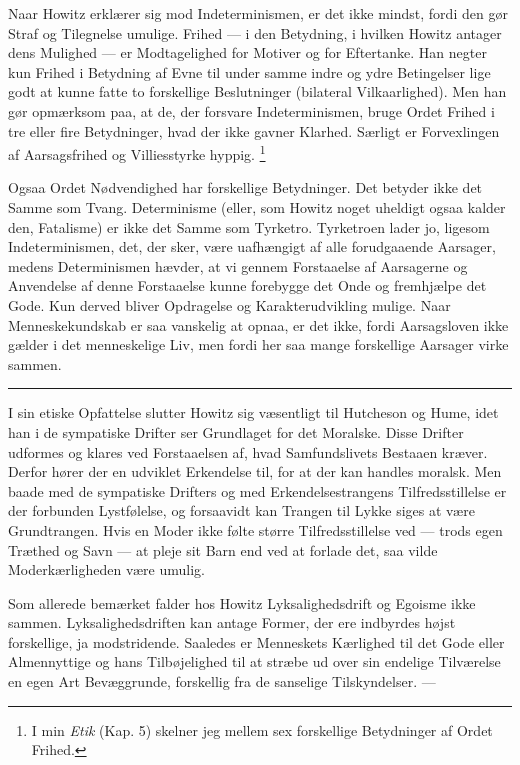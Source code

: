 \documentclass[12pt,a4paper,openany]{book}
\newcommand{\opage}[1]{\marginnote{\footnotesize\textit{[#1]}}}
\begin{document}
Naar Howitz erklærer sig mod Indeterminismen, er det ikke mindst, fordi den gør
Straf og Tilegnelse umulige. Frihed --- i den Betydning, i hvilken Howitz
antager dens Mulighed --- er Modtagelighed for Motiver og for Eftertanke. Han
negter kun Frihed i Betydning af Evne til under samme indre og ydre Betingelser
lige godt at kunne fatte to forskellige Beslutninger (bilateral Vilkaarlighed).
Men han gør opmærksom paa, at de, der forsvare Indeterminismen, bruge Ordet
Frihed i tre eller fire Betydninger, hvad der ikke gavner Klarhed. Særligt er
Forvexlingen af Aarsagsfrihed og Villiesstyrke hyppig.%
\footnote[1]{I min \textit{Etik} (Kap. 5) skelner jeg mellem sex forskellige
Betydninger af Ordet Frihed.}

Ogsaa Ordet Nødvendighed har forskellige Betydninger. Det betyder ikke det
Samme som Tvang. Determinisme (eller, som Howitz noget uheldigt ogsaa kalder
den, Fatalisme) er ikke det Samme som Tyrketro. Tyrketroen lader jo, ligesom
Indeterminismen, det, der sker, være uafhængigt af alle forudgaaende Aarsager,
medens Determinismen hævder, at vi gennem Forstaaelse af Aarsagerne og
Anvendelse af denne Forstaaelse kunne forebygge det Onde og fremhjælpe det
Gode. Kun derved bliver Opdragelse og Karakterudvikling mulige. Naar
Menneskekundskab er saa vanskelig at opnaa, er det ikke, fordi Aarsagsloven
ikke gælder i det menneskelige Liv, men fordi her saa mange forskellige
Aarsager virke sammen.

\begin{center}\rule{2cm}{0.4pt}\end{center}

I sin etiske Opfattelse slutter Howitz sig væsentligt til Hutcheson og Hume,
idet han i de sympatiske Drifter ser Grundlaget for det Moralske. Disse Drifter
udformes og klares ved Forstaaelsen af, hvad Samfundslivets Bestaaen kræver.
Derfor hører der en udviklet Erkendelse til, for at der kan handles moralsk.
Men baade med de sympatiske
\setcounter{footnote}{0}%
\opage{88}Drifters og med Erkendelsestrangens Tilfredsstillelse er der
forbunden Lystfølelse, og forsaavidt kan Trangen til Lykke siges at være
Grundtrangen. Hvis en Moder ikke følte større Tilfredsstillelse ved --- trods
egen Træthed og Savn --- at pleje sit Barn end ved at forlade det, saa vilde
Moderkærligheden være umulig.

Som allerede bemærket falder hos Howitz Lyksalighedsdrift og Egoisme ikke
sammen. Lyksalighedsdriften kan antage Former, der ere indbyrdes højst
forskellige, ja modstridende. Saaledes er Menneskets Kærlighed til det Gode
eller Almennyttige og hans Tilbøjelighed til at stræbe ud over sin endelige
Tilværelse en egen Art Bevæggrunde, forskellig fra de sanselige Tilskyndelser. ---
\end{document}
